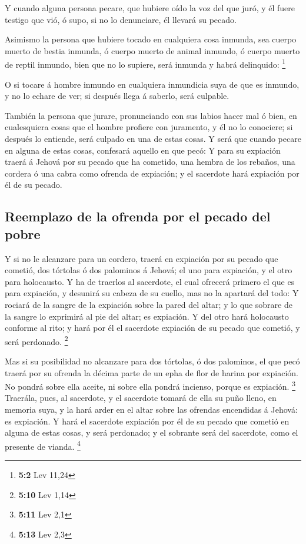  Y cuando alguna persona pecare, que hubiere oído la voz
del que juró, y él fuere testigo que vió, ó supo, si no lo denunciare,
él llevará su pecado.

 Asimismo la persona que hubiere tocado en cualquiera cosa
inmunda, sea cuerpo muerto de bestia inmunda, ó cuerpo muerto de animal
inmundo, ó cuerpo muerto de reptil inmundo, bien que no lo supiere, será
inmunda y habrá delinquido: \footnote{\textbf{5:2} Lev 11,24}

 O si tocare á hombre inmundo en cualquiera inmundicia
suya de que es inmundo, y no lo echare de ver; si después llega á
saberlo, será culpable.

 También la persona que jurare, pronunciando con sus
labios hacer mal ó bien, en cualesquiera cosas que el hombre profiere
con juramento, y él no lo conociere; si después lo entiende, será
culpado en una de estas cosas.  Y será que cuando pecare
en alguna de estas cosas, confesará aquello en que pecó: 
Y para su expiación traerá á Jehová por su pecado que ha cometido, una
hembra de los rebaños, una cordera ó una cabra como ofrenda de
expiación; y el sacerdote hará expiación por él de su pecado.

\hypertarget{reemplazo-de-la-ofrenda-por-el-pecado-del-pobre}{%
\subsection{Reemplazo de la ofrenda por el pecado del
pobre}\label{reemplazo-de-la-ofrenda-por-el-pecado-del-pobre}}

 Y si no le alcanzare para un cordero, traerá en expiación
por su pecado que cometió, dos tórtolas ó dos palominos á Jehová; el uno
para expiación, y el otro para holocausto.  Y ha de
traerlos al sacerdote, el cual ofrecerá primero el que es para
expiación, y desunirá su cabeza de su cuello, mas no la apartará del
todo:  Y rociará de la sangre de la expiación sobre la
pared del altar; y lo que sobrare de la sangre lo exprimirá al pie del
altar; es expiación.  Y del otro hará holocausto conforme
al rito; y hará por él el sacerdote expiación de su pecado que cometió,
y será perdonado. \footnote{\textbf{5:10} Lev 1,14}

 Mas si su posibilidad no alcanzare para dos tórtolas, ó
dos palominos, el que pecó traerá por su ofrenda la décima parte de un
epha de flor de harina por expiación. No pondrá sobre ella aceite, ni
sobre ella pondrá incienso, porque es expiación. \footnote{\textbf{5:11}
  Lev 2,1}  Traerála, pues, al sacerdote, y el sacerdote
tomará de ella su puño lleno, en memoria suya, y la hará arder en el
altar sobre las ofrendas encendidas á Jehová: es expiación.
 Y hará el sacerdote expiación por él de su pecado que
cometió en alguna de estas cosas, y será perdonado; y el sobrante será
del sacerdote, como el presente de vianda. \footnote{\textbf{5:13} Lev
  2,3}

